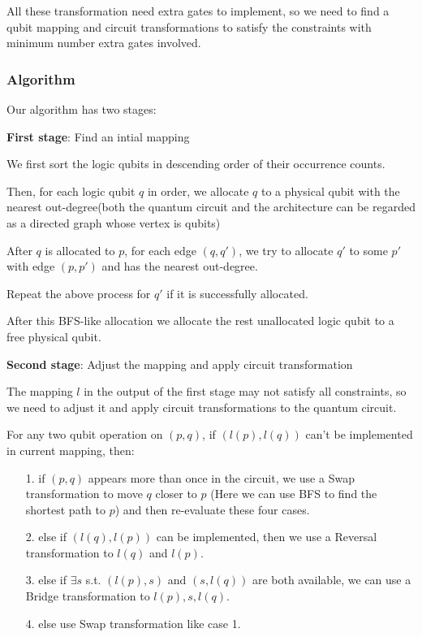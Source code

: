 All these transformation need extra gates to implement, so we need to find a qubit mapping and circuit transformations to satisfy the constraints with minimum number extra gates involved.

\subsubsection{Algorithm}

Our algorithm has two stages:

\textbf{First stage}: Find an intial mapping

We first sort the logic qubits in descending order of their occurrence counts.

Then, for each logic qubit $q$ in order, we allocate $q$ to a physical qubit with the nearest out-degree(both the quantum circuit and the architecture can be regarded as a directed graph whose vertex is qubits)

After $q$ is allocated to $p$, for each edge $(q,q')$, we try to allocate $q'$ to some $p'$ with edge $(p,p')$ and has the nearest out-degree.

Repeat the above process for $q'$ if it is successfully allocated.

After this BFS-like allocation we allocate the rest unallocated logic qubit to a free physical qubit.

\textbf{Second stage}: Adjust the mapping and apply circuit transformation

The mapping $l$ in the output of the first stage may not satisfy all constraints, so we need to adjust it and apply circuit transformations to the quantum circuit.

For any two qubit operation on $(p,q)$, if $(l(p),l(q))$ can't be implemented in current mapping, then:
\begin{itemize}
    \item[1.] if $(p,q)$ appears more than once in the circuit, we use a Swap transformation to move $q$ closer to $p$ (Here we can use BFS to find the shortest path to $p$) and then re-evaluate these four cases.
    \item[2.] else if $(l(q), l(p))$ can be implemented, then we use a Reversal transformation to $l(q)$ and $l(p)$.
    \item[3.] else if $\exists s$ s.t. $(l(p),s)$ and $(s, l(q))$ are both available, we can use a Bridge transformation to $l(p), s, l(q)$.
    \item[4.] else use Swap transformation like case 1.
\end{itemize}
